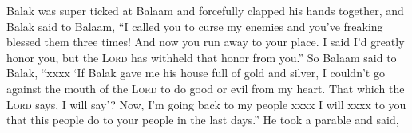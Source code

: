 \begin{inparaenum}
  
  \pvbb{}{}%
  
  
  \pvcc{}{}{}%
  
  
  \pvbb{}{}%
  
   Balak was super ticked at Balaam and forcefully clapped his hands together, and Balak said to Balaam, ``I called you to curse my enemies and you've freaking blessed them three times!%
   And now you run away to your place. I said I'd greatly honor you, but the \textsc{Lord} has withheld that honor from you.''%
   So Balaam said to Balak, ``xxxx%
   `If Balak gave me his house full of gold and silver, I couldn't go against the mouth of the \textsc{Lord} to do good or evil from my heart. That which the \textsc{Lord} says, I will say'?%
   Now, I'm going back to my people xxxx I will xxxx to you that this people do to your people in the last days.''%
   He took a parable and said,%
  
  
  
  
  
  \pvbb{}{}%
  
  \pvbb{}{}%
  
  
  
  \pvba{}%
  
  
  \pvbb{}{}%
  
  
  \pvbb{}{}%
  
  
  
  
  \pvbb{}{}%
  
\end{inparaenum}
